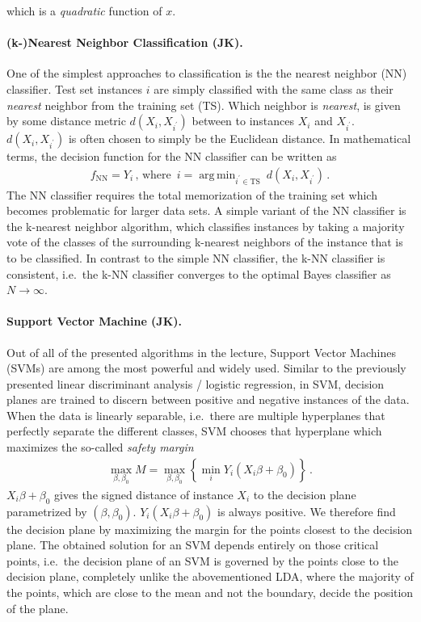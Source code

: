 \documentclass[12pt, a4paper]{scrartcl}
\DeclareMathOperator*{\argmin}{arg\,min}
\begin{document}
which is a \emph{quadratic} function of $x$. 

\paragraph{(k-)Nearest Neighbor Classification (JK).} One of the simplest approaches to classification is the the nearest neighbor (NN) classifier. Test set instances $i$ are simply classified with the same class as their \emph{nearest} neighbor from the training set (TS). 
Which neighbor is \emph{nearest},  is given by some distance metric $d(X_i, X_{i^\prime})$ between to instances $X_i$ and $X_{i^\prime}$. $d(X_i, X_{i^\prime})$ is often chosen to simply be the Euclidean distance.
In mathematical terms, the decision function for the NN classifier can be written as
\begin{align*}
	f_{\mathrm{NN}} = Y_i \, \text{,  where } \, i = \argmin_{i^\prime \in \mathrm{TS}} \: d(X_i, X_{i^\prime}) \, .
\end{align*}
The NN classifier requires the total memorization of the training set which becomes problematic for larger data sets.
A simple variant of the NN classifier is the k-nearest neighbor algorithm, which classifies instances by taking a majority vote of the classes of the surrounding k-nearest neighbors of the instance that is to be classified. In contrast to the simple NN classifier, the k-NN classifier is consistent, i.e.\  the k-NN classifier converges to the optimal Bayes classifier as $N\to\infty$.

\paragraph{Support Vector Machine (JK).} Out of all of the presented algorithms in the lecture, Support Vector Machines (SVMs) are among the most powerful and widely used. Similar to the previously presented linear discriminant analysis / logistic regression, in SVM, decision planes are trained to discern between positive and negative instances of the data. When the data is linearly separable, i.e.\  there are multiple hyperplanes that perfectly separate the different classes, SVM chooses that hyperplane which maximizes the so-called \emph{safety margin}
\begin{align}
	\max_{\beta, \beta_0} M = 	\max_{\beta, \beta_0} \left\{ \min_i Y_i ( X_i \beta + \beta_0) \right\} \, .
\end{align}
$X_i \beta + \beta_0$ gives the signed distance of instance $X_i$ to the decision plane parametrized by $(\beta, \beta_0)$. $Y_i (X_i \beta + \beta_0)$ is always positive. 
We therefore find the decision plane by maximizing the margin for the points closest to the decision plane. The obtained solution for an SVM depends entirely on those critical points, i.e.\  the decision plane of an SVM is governed by the points close to the decision plane, completely unlike the abovementioned LDA, where the majority of the points, which are close to the mean and not the boundary, decide the position of the plane. 
\end{document}
